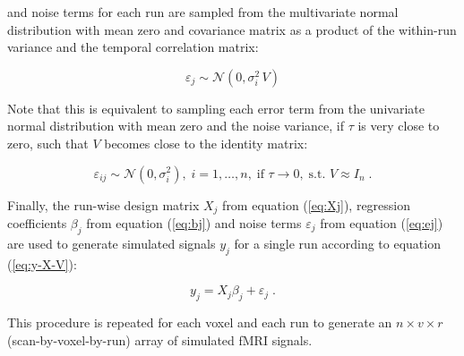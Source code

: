 \documentclass[a4paper,12pt]{article}
\begin{document}
and noise terms for each run are sampled from the multivariate normal distribution with mean zero and covariance matrix as a product of the within-run variance and the temporal correlation matrix:

\begin{equation} \label{eq:ej}
\varepsilon_j \sim \mathcal{N}(0, \sigma_i^2 \, V)
\end{equation}

Note that this is equivalent to sampling each error term from the univariate normal distribution with mean zero and the noise variance, if $\tau$ is very close to zero, such that $V$ becomes close to the identity matrix:

\begin{equation} \label{eq:eij}
\varepsilon_{ij} \sim \mathcal{N}(0, \sigma_i^2), \; i = 1,\ldots,n, \; \text{if } \tau \rightarrow 0, \; \text{s.t. } V \approx I_n \; .
\end{equation}

Finally, the run-wise design matrix $X_j$ from equation (\ref{eq:Xj}), regression coefficients $\beta_j$ from equation (\ref{eq:bj}) and noise terms $\varepsilon_j$ from equation (\ref{eq:ej}) are used to generate simulated signals $y_j$ for a single run according to equation (\ref{eq:y-X-V}):

\begin{equation} \label{eq:yj}
y_j = X_j \beta_j + \varepsilon_j \; .
\end{equation}

This procedure is repeated for each voxel and each run to generate an $n \times v \times r$ (scan-by-voxel-by-run) array of simulated fMRI signals.
\end{document}
